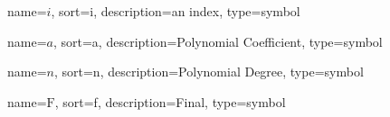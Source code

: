 	{%
		name=\ensuremath{i},
		sort=i,
		description=an index,
		type=symbol
	}
	\newcommand{\indexi}{\gls{sym:indexi}}

	{%
		name=\ensuremath{a},
		sort=a,
		description=Polynomial Coefficient,
		type=symbol
	}
	\newcommand{\coefficient}{\gls{sym:coefficient}}

	{%
		name=\ensuremath{n},
		sort=n,
		description=Polynomial Degree,
		type=symbol
	}
	\newcommand{\poldeg}{\gls{sym:poldeg}}

	{%
		name={\ensuremath{\mathrm{F}}},
		sort=f,
		description=Final,
		type=symbol
	}
	\newcommand{\final}{\gls{sym:final}}
